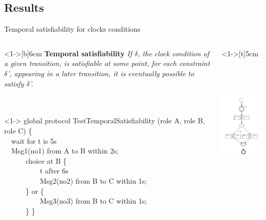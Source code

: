 \documentclass[8 pt]{beamer}
\newcommand{\BLUE}{\color[rgb]{0,0,0.69}}
\begin{document}
\subsection{Results}
\begin{frame}{Temporal satisfiability for clocks conditions}
\begin{columns}
\begin{column}<1->[b]{6cm}
\textbf{Temporal satisfiability }\textit{ If $\delta$, the clock condition of a given transition, is satisfiable at some point, for each constraint $\delta$', appearing in a later transition, it is eventually possible to satisfy $\delta$'.}\\
~~\\
~~\\
\begin{exampleblock}<1->{}
{\BLUE global protocol} TestTemporalSatisfiability (role A, role B, role C) \{ \\
~~{\BLUE wait for} t {\BLUE is} 5s\\
~~Msg1(no1) {\BLUE from} A {\BLUE to} B {\BLUE within} 2s;\\
~~~~~~{\BLUE choice at} B \{ \\
~~~~~~~~~~t {\BLUE after} 6s\\
~~~~~~~~~~Msg2(no2) {\BLUE from} B {\BLUE to} C {\BLUE within} 1s;\\
~~~~~~\} {\BLUE or} \{ \\
~~~~~~~~~~Msg3(no3) {\BLUE from} B {\BLUE to} C {\BLUE within} 1s;\\
~~~~~~\}
\}\\
\end{exampleblock}
\end{column}
\begin{column}<1->[t]{5cm}
\includegraphics[height=7cm]{TestTemporalSatisfiability}
\end{column}
\end{columns}
\end{frame}
\end{document}
